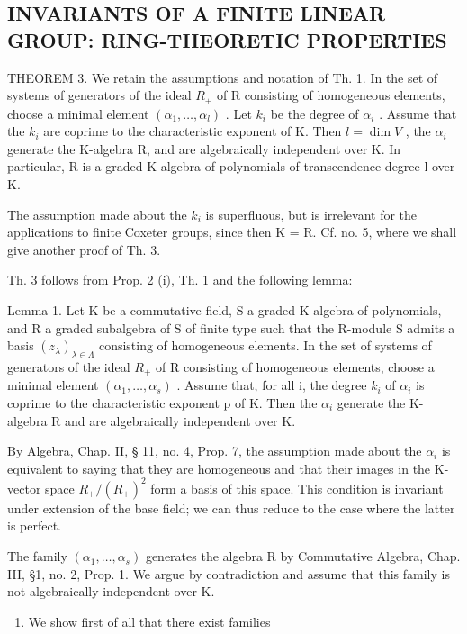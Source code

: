 \subsection{INVARIANTS OF A FINITE LINEAR GROUP: RING-THEORETIC PROPERTIES}

THEOREM 3. We retain the assumptions and notation of Th. 1. In the set of systems of generators of the ideal \(R_{+}\) of R consisting of homogeneous elements, choose a minimal element \((\alpha_{1},\ldots,\alpha_{l})\) . Let \(k_{i}\) be the degree of \(\alpha_{i}\) . Assume that the \(k_{i}\) are coprime to the characteristic exponent of K. Then \(l=\dim V\) , the \(\alpha_{i}\) generate the K-algebra R, and are algebraically independent over K. In particular, R is a graded K-algebra of polynomials of transcendence degree l over K.

The assumption made about the \(k_{i}\) is superfluous, but is irrelevant for the applications to finite Coxeter groups, since then K = R. Cf. no. 5, where we shall give another proof of Th. 3.

Th. 3 follows from Prop. 2 (i), Th. 1 and the following lemma:

Lemma 1. Let K be a commutative field, S a graded K-algebra of polynomials, and R a graded subalgebra of S of finite type such that the R-module S admits a basis \((z_{\lambda})_{\lambda \in \Lambda}\) consisting of homogeneous elements. In the set of systems of generators of the ideal \(R_{+}\) of R consisting of homogeneous elements, choose a minimal element \((\alpha_{1}, \ldots, \alpha_{s})\) . Assume that, for all i, the degree \(k_{i}\) of \(\alpha_{i}\) is coprime to the characteristic exponent p of K. Then the \(\alpha_{i}\) generate the K-algebra R and are algebraically independent over K.

By Algebra, Chap. II, § 11, no. 4, Prop. 7, the assumption made about the \(\alpha_{i}\) is equivalent to saying that they are homogeneous and that their images in the K-vector space \(R_{+}/(R_{+})^{2}\) form a basis of this space. This condition is invariant under extension of the base field; we can thus reduce to the case where the latter is perfect.

The family \((\alpha_{1},\ldots,\alpha_{s})\) generates the algebra R by Commutative Algebra, Chap. III, §1, no. 2, Prop. 1. We argue by contradiction and assume that this family is not algebraically independent over K.

\begin{enumerate}
\def\labelenumi{\arabic{enumi})}
\tightlist
\item
  We show first of all that there exist families
\end{enumerate}

